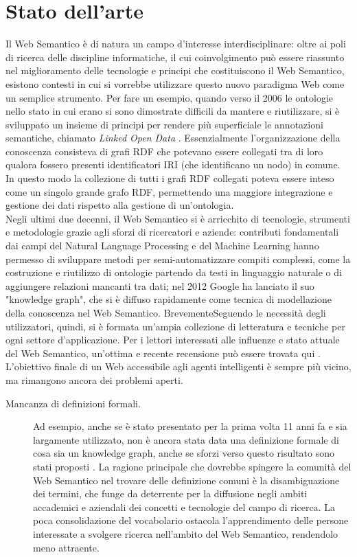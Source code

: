 \chapter[Stato dell'arte]{Stato dell'arte}
\label{chap:State-of-art}
Il Web Semantico è di natura un campo d'interesse interdisciplinare: oltre ai poli di ricerca delle discipline informatiche, il cui coinvolgimento può essere riassunto nel miglioramento delle tecnologie e principi che costituiscono il Web Semantico, esistono contesti in cui si vorrebbe utilizzare questo nuovo paradigma Web come un semplice strumento. Per fare un esempio, quando verso il 2006 le ontologie nello stato in cui erano si sono dimostrate difficili da mantere e riutilizzare, si è sviluppato un insieme di principi per rendere più superficiale le annotazioni semantiche, chiamato \textit{Linked Open Data} \cite{hitzler2021review}. Essenzialmente l'organizzazione della conoscenza consisteva di grafi RDF che potevano essere collegati tra di loro qualora fossero presenti identificatori IRI (che identificano un nodo) in comune. In questo modo la collezione di tutti i grafi RDF collegati poteva essere inteso come un singolo grande grafo RDF, permettendo una maggiore integrazione e gestione dei dati rispetto alla gestione di un'ontologia.\\
Negli ultimi due decenni, il Web Semantico si è arricchito di tecnologie, strumenti e metodologie grazie agli sforzi di ricercatori e aziende: contributi fondamentali dai campi del Natural Language Processing  e del Machine Learning hanno permesso di sviluppare metodi per semi-automatizzare compiti complessi, come la costruzione e riutilizzo di ontologie partendo da testi in linguaggio naturale o di aggiungere relazioni mancanti tra dati; nel 2012 Google ha lanciato il suo "knowledge graph", che si è diffuso rapidamente come tecnica di modellazione della conoscenza nel Web Semantico. BrevementeSeguendo le necessità degli utilizzatori, quindi, si è formata un'ampia collezione di letteratura e tecniche per ogni settore d'applicazione. Per i lettori interessati alle influenze e stato attuale del Web Semantico, un'ottima e recente recensione può essere trovata qui \cite{hitzler2021review}.\\
L'obiettivo finale di un Web accessibile agli agenti intelligenti è sempre più vicino, ma rimangono ancora dei problemi aperti.
\begin{description}
	\item[Mancanza di definizioni formali.] Ad esempio, anche se è stato presentato per la prima volta 11 anni fa e sia largamente utilizzato, non è ancora stata data una definizione formale di cosa sia un knowledge graph, anche se sforzi verso questo risultato sono stati proposti \cite{ehrlinger2016towards}. La ragione principale che dovrebbe spingere la comunità del Web Semantico nel trovare delle definizione comuni è la disambiguazione dei termini, che funge da deterrente per la diffusione negli ambiti accademici e aziendali dei concetti e tecnologie del campo di ricerca. La poca consolidazione del vocabolario ostacola l'apprendimento delle persone interessate a svolgere ricerca nell'ambito del Web Semantico, rendendolo meno attraente.
\end{description}


